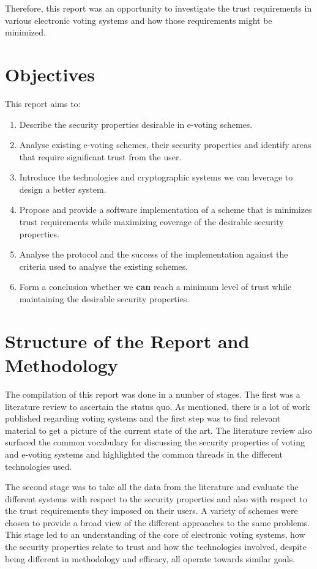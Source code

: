 Therefore, this report was an opportunity to investigate the trust requirements in various electronic voting systems and how those requirements might be minimized.


\section{Objectives}
\label{ch:intro:object}

This report aims to:

\begin{enumerate}
    \item Describe the security properties desirable in e-voting schemes.
    \item Analyse existing e-voting schemes, their security properties and identify areas that require significant trust from the user.
    \item Introduce the technologies and cryptographic systems we can leverage to design a better system.
    \item Propose and provide a software implementation of a scheme that is minimizes trust requirements while maximizing coverage of the desirable security properties.
    \item Analyse the protocol and the success of the implementation against the criteria used to analyse the existing schemes.
    \item Form a conclusion whether we {\textbf{can}} reach a minimum level of trust while maintaining the desirable security properties.
\end{enumerate}


\section{Structure of the Report and Methodology}
\label{ch:intro:method}

The compilation of this report was done in a number of stages. The first was a literature review to ascertain the status quo. As mentioned, there is a lot of work published regarding voting systems and the first step was to find relevant material to get a picture of the current state of the art. The literature review also surfaced the common vocabulary for discussing the security properties of voting and e-voting systems and highlighted the common threads in the different technologies used.

The second stage was to take all the data from the literature and evaluate the different systems with respect to the security properties and also with respect to the trust requirements they imposed on their users. A variety of schemes were chosen to provide a broad view of the different approaches to the same problems.
This stage led to an understanding of the core of electronic voting systems, how the security properties relate to trust and how the technologies involved, despite being different in methodology and efficacy, all operate towards similar goals.

